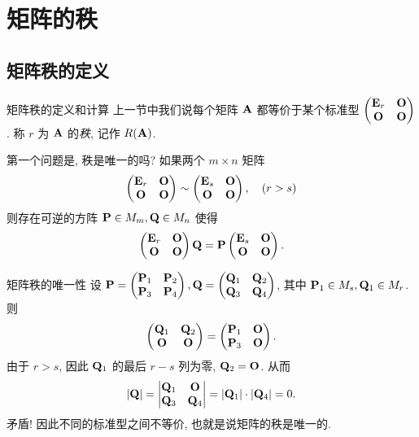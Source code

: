 \section{矩阵的秩}

\subsection{矩阵秩的定义}

\begin{frame}{矩阵秩的定义和计算}
	\onslide<+->
	上一节中我们说每个矩阵 ${\mathbf{A}}$ 都等价于某个标准型
	$\begin{pmatrix}
		{\mathbf{E}}_r&{\mathbf{O}}\\
		{\mathbf{O}}&{\mathbf{O}}
	\end{pmatrix}$.
	\onslide<+->
	称 $r$ 为 ${\mathbf{A}}$ 的\emph{秩}, 记作 \alert{$R({\mathbf{A}})$}.

	\onslide<+->
	第一个问题是, 秩是唯一的吗?
	\onslide<+->
	如果两个 $m\times n$ 矩阵
	\[\begin{pmatrix}
		{\mathbf{E}}_r&{\mathbf{O}}\\
		{\mathbf{O}}&{\mathbf{O}}
	\end{pmatrix}\sim\begin{pmatrix}
		{\mathbf{E}}_s&{\mathbf{O}}\\
		{\mathbf{O}}&{\mathbf{O}}
	\end{pmatrix},\quad(r>s)\]
	则存在可逆的方阵 ${\mathbf{P}}\in M_m,{\mathbf{Q}}\in M_n$ 使得
	\[\begin{pmatrix}
		{\mathbf{E}}_r&{\mathbf{O}}\\
		{\mathbf{O}}&{\mathbf{O}}
	\end{pmatrix}{\mathbf{Q}}={\mathbf{P}}\begin{pmatrix}
		{\mathbf{E}}_s&{\mathbf{O}}\\
		{\mathbf{O}}&{\mathbf{O}}
	\end{pmatrix}.\]
\end{frame}


\begin{frame}{矩阵秩的唯一性}
	\onslide<+->
	设 ${\mathbf{P}}=\begin{pmatrix}
		{\mathbf{P}}_1&{\mathbf{P}}_2\\{\mathbf{P}}_3&{\mathbf{P}}_4
	\end{pmatrix},{\mathbf{Q}}=\begin{pmatrix}
		{\mathbf{Q}}_1&{\mathbf{Q}}_2\\{\mathbf{Q}}_3&{\mathbf{Q}}_4
	\end{pmatrix}$, 其中 ${\mathbf{P}}_1\in M_s,{\mathbf{Q}}_1\in M_r$.
	\onslide<+->
	则 \[\begin{pmatrix}
		{\mathbf{Q}}_1&{\mathbf{Q}}_2\\{\mathbf{O}}&{\mathbf{O}}
	\end{pmatrix}=\begin{pmatrix}
		{\mathbf{P}}_1&{\mathbf{O}}\\{\mathbf{P}}_3&{\mathbf{O}}
	\end{pmatrix}.\]
	\onslide<+->
	由于 $r>s$, 因此 ${\mathbf{Q}}_1$ 的最后 $r-s$ 列为零, ${\mathbf{Q}}_2={\mathbf{O}}$.
	\onslide<+->
	从而
	\[|{\mathbf{Q}}|=\begin{vmatrix}
		{\mathbf{Q}}_1&{\mathbf{O}}\\{\mathbf{Q}}_3&{\mathbf{Q}}_4
	\end{vmatrix}=|{\mathbf{Q}}_1|\cdot|{\mathbf{Q}}_4|=0.\]
	\onslide<+->
	矛盾! 因此不同的标准型之间不等价, 也就是说矩阵的秩是唯一的.
\end{frame}


